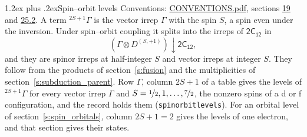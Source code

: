 \documentclass[10pt,a4paper]{article}
\makeatletter
\renewcommand\section{\@startsection{section}{1}{\z@}{-3ex plus -1ex minus -.2ex}%
  {1.2ex plus .2ex}{\normalfont\large\sffamily\bfseries\color{parttitle}}}
\numberwithin{equation}{section}
\newcommand{\grp}[1]{\mathsf{#1}}
\newcommand{\restr}[2]{#1\!\downarrow#2}
\newcommand{\irrJp}[2]{D^{(#1,#2)}}
\newcommand{\irrprod}{\otimes}
\newcommand{\term}[2]{{}^{#1}#2}
\makeatother
\begin{document}
\section{Spin--orbit levels}\label{s:spin_orbit}
Conventions: \href{../../CONVENTIONS.pdf}{CONVENTIONS.pdf}, sections \href{../../../rotation/CONVENTIONS.pdf\#conv.19}{19} and \href{../../CONVENTIONS.pdf\#conv.25.2}{25.2}.
\leavevmode\label{n:local.spin}\label{n:symbol.term}A term $\term{2S+1}{\Gamma}$ is the vector irrep $\Gamma$ with the spin $S$, a spin even under the inversion. Under spin--orbit coupling it splits into the irreps of $\grp{2C_{12}}$ in
\begin{equation}\label{e:spinorbit}\restr{(\Gamma \irrprod \irrJp{S}{+1})}{\grp{2C_{12}}},\end{equation}
and they are spinor irreps at half-integer $S$ and vector irreps at integer $S$. They follow from the products of section~\ref{s:fusion} and the multiplicities of section~\ref{s:subduction_parent}. Row $\Gamma$, column $2S + 1$ of a table gives the levels of $\term{2S+1}{\Gamma}$ for every vector irrep $\Gamma$ and $S = \nicefrac{1}{2}, 1, \dots, \nicefrac{7}{2}$, the nonzero spins of a d or f configuration, and the record holds them (\texttt{spinorbitlevels}). For an orbital level of section~\ref{s:spin_orbitals}, column $2S + 1 = 2$ gives the levels of one electron, and that section gives their states.
\end{document}
